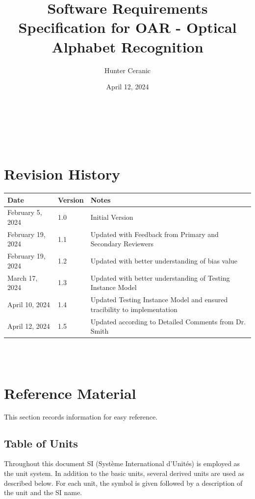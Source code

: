 \documentclass[12pt]{article}
\begin{document}
\title{Software Requirements Specification for OAR - Optical Alphabet Recognition} 
\author{Hunter Ceranic}
\date{April 12, 2024}
	
\maketitle

~\newpage


\tableofcontents

~\newpage

\section*{Revision History}

\begin{tabularx}{\textwidth}{p{3cm}p{2cm}X}
\toprule {\bf Date} & {\bf Version} & {\bf Notes}\\
\midrule
February 5, 2024 & 1.0 & Initial Version\\
February 19, 2024 & 1.1 & Updated with Feedback from Primary and Secondary Reviewers\\
February 19, 2024 & 1.2 & Updated with better understanding of bias value\\
March 17, 2024 & 1.3 & Updated with better understanding of Testing Instance Model\\
April 10, 2024 & 1.4 & Updated Testing Instance Model and ensured tracibility to implementation\\
April 12, 2024 & 1.5 & Updated according to Detailed Comments from Dr. Smith\\
\bottomrule
\end{tabularx}

~\\

~\newpage

\section{Reference Material}

This section records information for easy reference.

\subsection{Table of Units}

Throughout this document SI (Syst\`{e}me International d'Unit\'{e}s) is employed
as the unit system.  In addition to the basic units, several derived units are
used as described below.  For each unit, the symbol is given followed by a
description of the unit and the SI name.
~\newline
\end{document}
